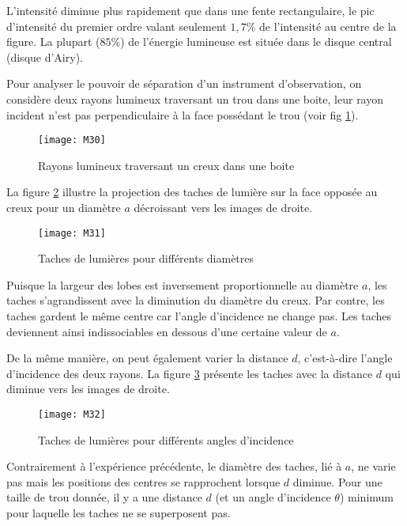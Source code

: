 \noindent L'intensité diminue plus rapidement que dans une fente rectangulaire, le pic d'intensité du premier ordre valant seulement $1,7\%$ de l'intensité au centre de la figure. La plupart ($85\%$) de l'énergie lumineuse est située dans le disque central (disque d'Airy).

\noindent Pour analyser le pouvoir de séparation d'un instrument d'observation, on considère deux rayons lumineux traversant un trou dans une boite, leur rayon incident n'est pas perpendiculaire à la face possédant le trou (voir fig \ref{d4}).

\begin{figure}[h]
    \centering
    \texttt{[image: M30]}
    \caption{Rayons lumineux traversant un creux dans une boite}
    \label{d4}
\end{figure}

\noindent La figure \ref{d6} illustre la projection des taches de lumière sur la face opposée au creux pour un diamètre $a$ décroissant vers les images de droite.

\begin{figure}[h]
    \centering
    \texttt{[image: M31]}
    \caption{Taches de lumières pour différents diamètres}
    \label{d6}
\end{figure}

\noindent Puisque la largeur des lobes est inversement proportionnelle au diamètre $a$, les taches s'agrandissent avec la diminution du diamètre du creux. Par contre, les taches gardent le même centre car l'angle d'incidence ne change pas.
Les taches deviennent ainsi indissociables en dessous d'une certaine valeur de $a$. 

\noindent De la même manière, on peut également varier la distance $d$, c'est-à-dire l'angle d'incidence des deux rayons. La figure \ref{d8} présente les taches avec la distance $d$ qui diminue vers les images de droite.

\begin{figure}[h]
    \centering
    \texttt{[image: M32]}
    \caption{Taches de lumières pour différents angles d'incidence}
    \label{d8}
\end{figure}

\noindent Contrairement à l'expérience précédente, le diamètre des taches, lié à $a$, ne varie pas mais les positions des centres se rapprochent lorsque $d$ diminue. Pour une taille de trou donnée, il y a une distance $d$ (et un angle d'incidence $\theta$) minimum pour laquelle les taches ne se superposent pas. 

